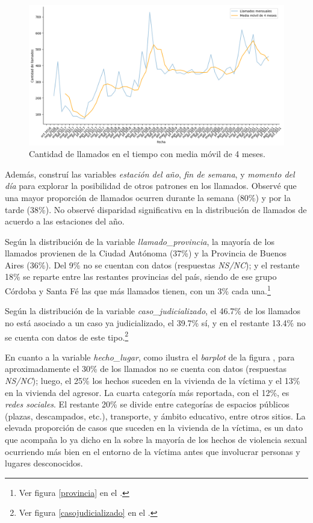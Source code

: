 \documentclass[10 pt]{article}
\begin{document}
\begin{figure}[H]
    \begin{center}
    \includegraphics[scale=.5]{images/latex_trend_llamados.png}
    \caption{Cantidad de llamados en el tiempo con media móvil de 4 meses.}
    \label{trend}
    \end{center}
    \end{figure}

Además, construí las variables \textit{estación del año}, \textit{fin de semana}, y \textit{momento del día} para explorar la posibilidad de otros patrones en los llamados. Observé que una mayor proporción de llamados ocurren durante la semana (80\%) y por la tarde (38\%). No observé disparidad significativa en la distribución de llamados de acuerdo a las estaciones del año.


Según la distribución de la variable \textit{llamado\_provincia}, la mayoría de los llamados provienen de la Ciudad Autónoma (37\%) y la Provincia de Buenos Aires (36\%). Del 9\% no se cuentan con datos (respuestas \textit{NS/NC}); y el restante 18\% se reparte entre las restantes provincias del país, siendo de ese grupo Córdoba y Santa Fé las que más llamados tienen, con un 3\% cada una.\footnote{Ver figura \ref{provincia} en el .}

Según la distribución de la variable \textit{caso\_judicializado}, el 46.7\% de los llamados no está asociado a un caso ya judicializado, el 39.7\% sí, y en el restante 13.4\% no se cuenta con datos de este tipo.\footnote{Ver figura \ref{casojudicializado} en el .} 

En cuanto a la variable \textit{hecho\_lugar}, como ilustra el \textit{barplot} de la figura , para aproximadamente el 30\% de los llamados no se cuenta con datos (respuestas \textit{NS/NC}); luego, el 25\% los hechos suceden en la vivienda de la víctima y el 13\% en la vivienda del agresor. La cuarta categoría más reportada, con el 12\%, es \textit{redes sociales}. El restante 20\% se divide entre categorías de espacios públicos (plazas, descampados, etc.), transporte, y ámbito educativo, entre otros sitios. La elevada proporción de casos que suceden en la vivienda de la víctima, es un dato que acompaña lo ya dicho en la  sobre la mayoría de los hechos de violencia sexual ocurriendo más bien en el entorno de la víctima antes que involucrar personas y lugares desconocidos. 
\end{document}
